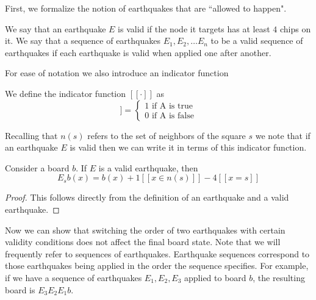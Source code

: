 \documentclass[runningheads,a4paper]{llncs}
\begin{document}
First, we formalize the notion of earthquakes that are ``allowed to happen".

\begin{definition}
We say that an earthquake $E$ is valid if the node it targets has at least $4$ chips on it. 
We say that a sequence of earthquakes $E_1, E_2, \ldots E_n$ to be a valid sequence of earthquakes if each earthquake is valid when applied one after another. 
\end{definition}


For ease of notation we also introduce an indicator function
\begin{definition}
We define the indicator function $[[\cdot]]$ as 
\begin{equation*}
[[A]] = \begin{cases} 1 \text{ if A is true} \\ 0 \text{ if A is false} \end{cases}
\end{equation*}
\end{definition}

Recalling that $n(s)$ refers to the set of neighbors of the square $s$ we note that if an earthquake $E$ is valid then we can write it in terms of this indicator function.
\begin{lemma} 
\label{earthquakeredefine}
Consider a board $b$. If $E$ is a valid earthquake, then 
\begin{equation*}
E_s b(x) = b(x) + 1[[ x \in n(s)]] - 4[[x =s]]
\end{equation*}
\end{lemma}
\begin{proof}
This follows directly from the definition of an earthquake and a valid earthquake. 
\end{proof}

Now we can show that switching the order of two earthquakes with certain validity conditions does not affect the final board state. Note that we will frequently refer to sequences of earthquakes. Earthquake sequences correspond to those earthquakes being applied in the order the sequence specifies. For example, if we have a sequence of earthquakes $E_1,E_2,E_3$ applied to board $b$, the resulting board is $E_3E_2E_1b$.
\end{document}
